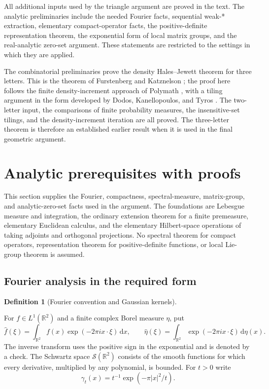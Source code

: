\documentclass[11pt]{amsart}
\newcommand{\R}{\mathbb R}
\newcommand{\dd}{\,\mathrm d}
\theoremstyle{definition}
\newtheorem{definition}[theorem]{Definition}
\theoremstyle{remark}
\numberwithin{equation}{section}
\providecommand{\lean}[1]{}
\begin{document}
All additional inputs used by the triangle argument are proved in the
text.  The analytic preliminaries include the needed Fourier facts,
sequential weak-* extraction, elementary compact-operator facts, the
positive-definite representation theorem, the exponential form of local
matrix groups, and the real-analytic zero-set argument.  These statements
are restricted to the settings in which they are applied.

The combinatorial preliminaries prove the density Hales--Jewett theorem
for three letters.  This is the theorem of Furstenberg and Katznelson
\cite{FK}; the proof here follows the finite density-increment approach
of Polymath \cite{Polymath}, with a tiling argument in the form developed
by Dodos, Kanellopoulos, and Tyros \cite{DKT}.  The two-letter input,
the comparisons of finite probability measures, the insensitive-set
tilings, and the density-increment iteration are all proved.  The
three-letter theorem is therefore an established earlier result when it
is used in the final geometric argument.



\section{Analytic prerequisites with proofs}\label{ext:section}

This section supplies the Fourier, compactness, spectral-measure,
matrix-group, and analytic-zero-set facts used in the argument.  The
foundations are Lebesgue measure and integration, the ordinary extension
theorem for a finite premeasure, elementary Euclidean calculus, and the
elementary Hilbert-space operations of taking adjoints and orthogonal
projections.  No spectral theorem for compact operators, representation
theorem for positive-definite functions, or local Lie-group theorem is
assumed.

\subsection{Fourier analysis in the required form}

\begin{definition}[Fourier convention and Gaussian kernels]
\label{ext:fourier-convention}
\lean{Auto.FCMeasure,Auto.FCMeasure.fourier,Auto.gaussKernel}
For $f\in L^1(\R^2)$ and a finite complex Borel measure $\eta$, put
\[
 \widehat f(\xi)=\int_{\R^2}f(x)\exp(-2\pi i x\cdot\xi)\dd x,
 \qquad
 \widehat\eta(\xi)=\int_{\R^2}\exp(-2\pi i x\cdot\xi)\dd\eta(x).
\]
The inverse transform uses the positive sign in the exponential and
is denoted by a check.  The Schwartz space $\mathcal S(\R^2)$ consists
of the smooth functions for which every derivative, multiplied by any
polynomial, is bounded.  For $t>0$ write
\[
 \gamma_t(x)=t^{-1}\exp(-\pi|x|^2/t).
\]
\end{definition}
\end{document}
